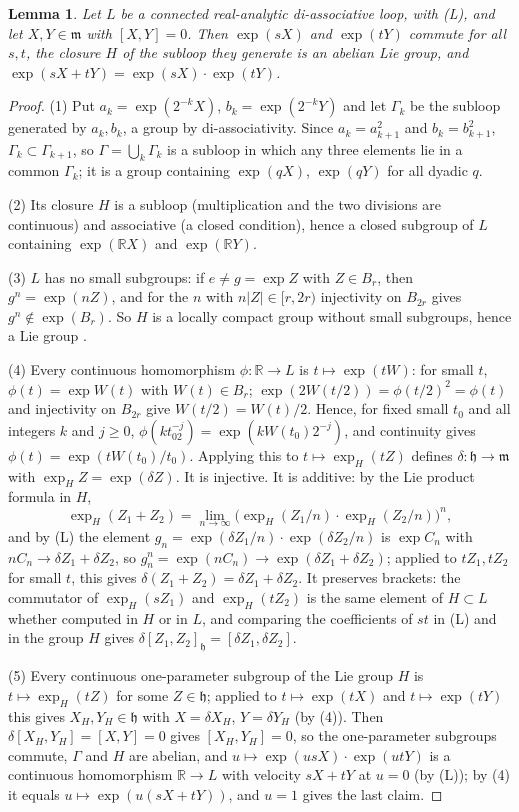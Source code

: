 \documentclass[11pt,reqno]{amsart}
\newtheorem{lemma}[theorem]{Lemma}
\theoremstyle{definition}
\theoremstyle{remark}
\numberwithin{equation}{section}
\newcommand{\R}{\mathbb{R}}
\begin{document}
\begin{lemma}\label{lem:K3}
Let $L$ be a connected real-analytic di-associative loop, with (L), and let $X,Y\in\mathfrak m$ with $[X,Y]=0$.  Then $\exp(sX)$ and $\exp(tY)$ commute for all $s,t$, the
closure $H$ of the subloop they generate is an abelian Lie group, and $\exp(sX+tY)=\exp(sX)\cdot\exp(tY)$.
\end{lemma}
\begin{proof}
(1) Put $a_k=\exp(2^{-k}X)$, $b_k=\exp(2^{-k}Y)$ and let $\Gamma_k$ be the subloop generated by $a_k,b_k$, a group by
di-associativity.  Since $a_k=a_{k+1}^2$ and $b_k=b_{k+1}^2$, $\Gamma_k\subset\Gamma_{k+1}$, so $\Gamma=\bigcup_k\Gamma_k$ is a subloop in
which any three elements lie in a common $\Gamma_k$; it is a group containing $\exp(qX)$, $\exp(qY)$ for all dyadic $q$.

(2) Its closure $H$ is a subloop (multiplication and the two divisions are continuous) and associative (a closed
condition), hence a closed subgroup of $L$ containing $\exp(\R X)$ and $\exp(\R Y)$.

(3) $L$ has no small subgroups: if $e\ne g=\exp Z$ with $Z\in B_r$, then $g^n=\exp(nZ)$, and for the $n$ with
$n\lvert Z\rvert\in[r,2r)$ injectivity on $B_{2r}$ gives $g^n\notin\exp(B_r)$.  So $H$ is a locally compact group without small
subgroups, hence a Lie group \cite{Gleason52,Yamabe53,MZ}.

(4) Every continuous homomorphism $\phi\colon\R\to L$ is $t\mapsto\exp(tW)$: for small $t$, $\phi(t)=\exp W(t)$ with $W(t)\in B_r$;
$\exp(2W(t/2))=\phi(t/2)^2=\phi(t)$ and injectivity on $B_{2r}$ give $W(t/2)=W(t)/2$.  Hence, for fixed small $t_0$ and all integers $k$ and $j\ge0$,
$\phi(kt_02^{-j})=\exp(kW(t_0)2^{-j})$, and continuity gives $\phi(t)=\exp(tW(t_0)/t_0)$.  Applying this to $t\mapsto\exp_H(tZ)$ defines $\delta\colon\mathfrak h\to\mathfrak m$ with
$\exp_H Z=\exp(\delta Z)$.  It is injective.  It is additive: by the Lie product formula in $H$,
\[
\exp_H(Z_1+Z_2)=\lim_{n\to\infty}\bigl(\exp_H(Z_1/n)\cdot\exp_H(Z_2/n)\bigr)^n,
\]
and by (L) the element $g_n=\exp(\delta Z_1/n)\cdot\exp(\delta Z_2/n)$ is
$\exp C_n$ with $nC_n\to\delta Z_1+\delta Z_2$, so $g_n^n=\exp(nC_n)\to\exp(\delta Z_1+\delta Z_2)$; applied to $tZ_1,tZ_2$ for small $t$,
this gives $\delta(Z_1+Z_2)=\delta Z_1+\delta Z_2$.  It preserves brackets: the commutator of $\exp_H(sZ_1)$ and $\exp_H(tZ_2)$ is
the same element of $H\subset L$ whether computed in $H$ or in $L$, and comparing the coefficients of $st$ in (L) and in the
group $H$ gives $\delta[Z_1,Z_2]_{\mathfrak h}=[\delta Z_1,\delta Z_2]$.

(5) Every continuous one-parameter subgroup of the Lie group $H$ is $t\mapsto\exp_H(tZ)$ for some $Z\in\mathfrak h$; applied to
$t\mapsto\exp(tX)$ and $t\mapsto\exp(tY)$ this gives $X_H,Y_H\in\mathfrak h$ with $X=\delta X_H$, $Y=\delta Y_H$ (by (4)).  Then $\delta[X_H,Y_H]=[X,Y]=0$ gives $[X_H,Y_H]=0$, so the one-parameter subgroups commute, $\Gamma$ and $H$
are abelian, and $u\mapsto\exp(usX)\cdot\exp(utY)$ is a continuous homomorphism $\R\to L$ with velocity $sX+tY$ at $u=0$ (by (L));
by (4) it equals $u\mapsto\exp(u(sX+tY))$, and $u=1$ gives the last claim.
\end{proof}
\end{document}
